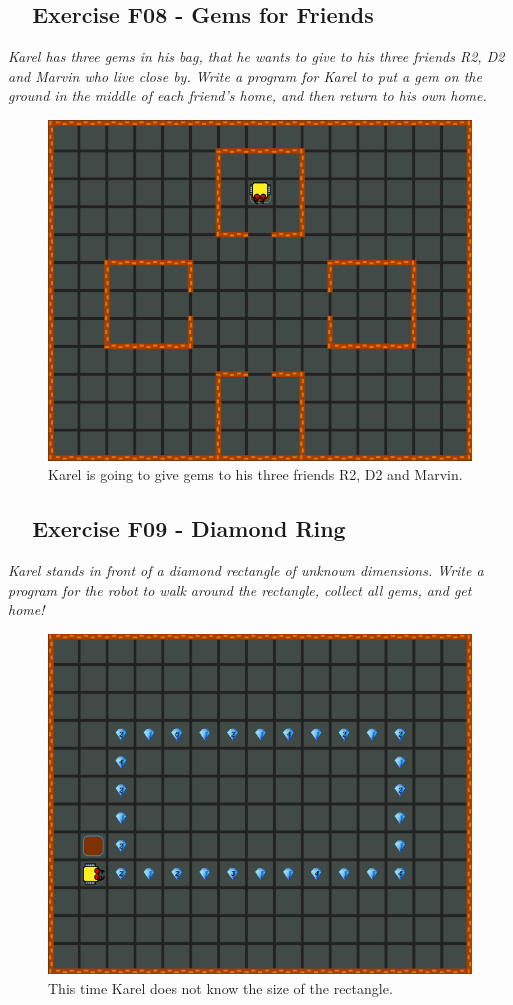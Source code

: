 \documentclass[article,A4,12pt]{llncs}
\begin{document}
{{{{\subsection{\ \ Exercise F08 - Gems for Friends}

{\em Karel has three gems in his bag, that he wants to give to his three friends R2, D2 and Marvin who live close by. Write a program for Karel to put a gem on the ground in the middle of each friend's home, and then return to his own home.}\\[-7mm]


\begin{figure}[!ht]
\begin{center}
\includegraphics[height=0.4\textwidth]{img/f08.png}
\end{center}
\vspace{-4mm}
\caption{Karel is going to give gems to his three friends R2, D2 and Marvin.}
\label{fig:f08}
\vspace{-10mm}
\end{figure}
\noindent
\newpage

\subsection{\ \ Exercise F09 - Diamond Ring}

{\em Karel stands in front of a diamond rectangle of unknown dimensions. Write a program for the robot to walk around the rectangle, collect all gems, and get home!}\\[-7mm]


\begin{figure}[!ht]
\begin{center}
\includegraphics[height=0.4\textwidth]{img/f09.png}
\end{center}
\vspace{-4mm}
\caption{This time Karel does not know the size of the rectangle.}
\label{fig:f09}
\vspace{-10mm}
\end{figure}
\noindent

}}}}
\end{document}
